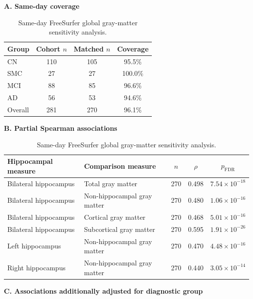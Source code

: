 \documentclass{article}
\begin{document}
\begin{table}[!htbp]
\centering
\caption{Same-day FreeSurfer global gray-matter sensitivity analysis.}
\label{tab:tableS10}
\footnotesize

\textbf{A. Same-day coverage}

\vspace{1mm}
\begin{tabular}{@{}lccc@{}}
\toprule
\textbf{Group} & \textbf{Cohort \(n\)} & \textbf{Matched \(n\)} & \textbf{Coverage}\\
\midrule
CN & 110 & 105 & 95.5\% \\
SMC & 27 & 27 & 100.0\% \\
MCI & 88 & 85 & 96.6\% \\
AD & 56 & 53 & 94.6\% \\
Overall & 281 & 270 & 96.1\% \\
\bottomrule
\end{tabular}

\vspace{3mm}
\textbf{B. Partial Spearman associations}

\vspace{1mm}
\setlength{\tabcolsep}{3pt}
\begin{tabular}{@{}>{\raggedright\arraybackslash}p{4.0cm}>{\raggedright\arraybackslash}p{4.3cm}ccc@{}}
\toprule
\textbf{Hippocampal measure} & \textbf{Comparison measure} & \textbf{\(n\)} & \textbf{\(\rho\)} & \textbf{\(p_{\mathrm{FDR}}\)}\\
\midrule
Bilateral hippocampus & Total gray matter & 270 & 0.498 & \(7.54\times10^{-18}\) \\
Bilateral hippocampus & Non-hippocampal gray matter & 270 & 0.480 & \(1.06\times10^{-16}\) \\
Bilateral hippocampus & Cortical gray matter & 270 & 0.468 & \(5.01\times10^{-16}\) \\
Bilateral hippocampus & Subcortical gray matter & 270 & 0.595 & \(1.91\times10^{-26}\) \\
Left hippocampus & Non-hippocampal gray matter & 270 & 0.470 & \(4.48\times10^{-16}\) \\
Right hippocampus & Non-hippocampal gray matter & 270 & 0.440 & \(3.05\times10^{-14}\) \\
\bottomrule
\end{tabular}

\vspace{3mm}
\textbf{C. Associations additionally adjusted for diagnostic group}


\end{table}
\end{document}
